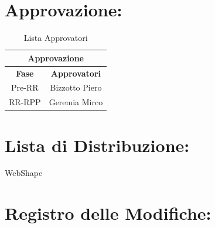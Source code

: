\section*{\LARGE Approvazione:}
 
\begin{table}[!h]
  \begin{center}
    \begin{tabular}
      {|c|c|}
      \hline
      \multicolumn{2}{|c|}{ \textbf{Approvazione} } \\
      \hline
      \textbf{Fase} & \textbf{Approvatori} \\
      \hline
      {Pre-RR} & Bizzotto Piero \\
      \hline
      {RR-RPP} & Geremia Mirco \\
      \hline
    \end{tabular}
    \caption{Lista Approvatori} %
    \label{tabapprovazione}
  \end{center}
\end{table}
\textbf{}
 
 
\section*{\LARGE Lista di Distribuzione:}
 
  \begin{elenconumerato}{\normindent}
    \item WebShape
  \end{elenconumerato}
 
\newpage
 
\section*{\LARGE Registro delle Modifiche:}
 

